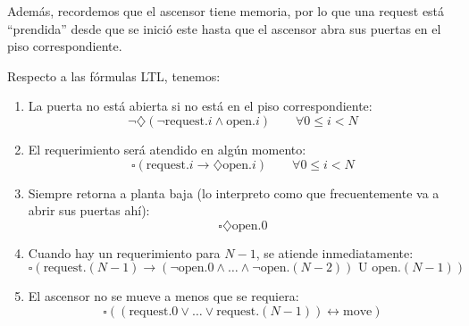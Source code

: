 \documentclass{article}
\begin{document}
Además, recordemos que el ascensor tiene memoria, por lo que una request está ``prendida'' desde que se inició este hasta que el ascensor abra sus puertas en el piso correspondiente.

Respecto a las fórmulas LTL, tenemos:
\begin{enumerate}
	\item La puerta no está abierta si no está en el piso correspondiente:
	      \begin{equation*}
		      \neg \diamondsuit (\neg \text{request}.i \land \text{open}.i) \qquad \forall 0 \leq i < N
	      \end{equation*}
	\item El requerimiento será atendido en algún momento:
	      \begin{equation*}
		      \square (\text{request}.i \to \diamondsuit \text{open}.i) \qquad \forall 0 \leq i < N
	      \end{equation*}
	\item Siempre retorna a planta baja (lo interpreto como que frecuentemente va a abrir sus puertas ahí):
	      \begin{equation*}
		      \square \diamondsuit \text{open}.0
	      \end{equation*}
	\item Cuando hay un requerimiento para $N-1$, se atiende inmediatamente:
	      \begin{equation*}
		      \square (\text{request}.(N-1) \to (\neg \text{open}.0 \land \dots \land \neg \text{open}.(N-2)) \text{ U } \text{open}.(N-1))
	      \end{equation*}
	\item El ascensor no se mueve a menos que se requiera:
	      \begin{equation*}
		      \square ((\text{request}.0 \lor \dots \lor \text{request}.(N-1)) \leftrightarrow \text{move})
	      \end{equation*}
\end{enumerate}
\end{document}
